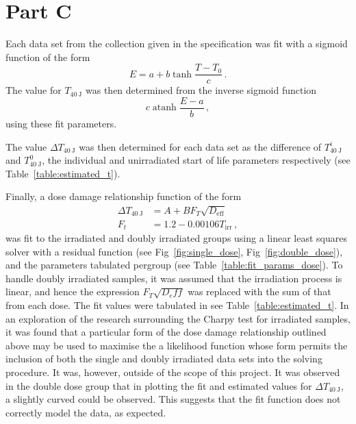 \documentclass{article}
\begin{document}
    
    
    
\section{Part C}
    Each data set from the collection given in the specification was fit with a sigmoid function of the form
    \begin{equation}
    \label{eq:sigmoid}
        E=a + b\tanh{\frac{T-T_0}{c}}\,.
    \end{equation}
    The value for $T_{\SI{40}{\joule}}$ was then determined from the inverse sigmoid function 
    \begin{equation}
        c\operatorname{atanh}{\frac{E-a}{b}}\,,
    \end{equation}
    using these fit parameters.
    
    The value $\Delta T_{\SI{40}{\joule}}$ was then determined for each data set as the difference of $T^i_{\SI{40}{\joule}}$ and $T^0_{\SI{40}{\joule}}$, the individual and unirradiated start of life parameters respectively (see Table~\ref{table:estimated_t}).
    
    Finally, a dose damage relationship function of the form 
    \begin{align}
    \label{eq:dose_damage}
    \Delta T_{\SI{40}{\joule}} &= A+B F_T\sqrt{D_{\text{eff}}} \\
    F_t &= 1.2 - 0.00106T_{\text{irr}}\,,
    \end{align}
    was fit to the irradiated and doubly irradiated groups using a linear least squares solver with a residual function (see Fig~\ref{fig:single_dose}, Fig~\ref{fig:double_dose}), and the parameters tabulated per\textendash group (see Table~\ref{table:fit_params_dose}). To handle doubly irradiated samples, it was assumed that the irradiation process is linear, and hence the expression $F_T\sqrt{D_eff}$ was replaced with the sum of that from each dose. The fit values were tabulated in see Table~\ref{table:estimated_t}. In an exploration of the research surrounding the Charpy test for irradiated samples, it was found that a particular form of the dose damage relationship outlined above may be used to maximise the a likelihood function whose form permits the inclusion of both the single and doubly irradiated data sets into the solving procedure. It was, however, outside of the scope of this project. It was observed in the double dose group that in plotting the fit and estimated values for $\Delta T_{\SI{40}{\joule}}$, a slightly curved could be observed. This suggests that the fit function does not correctly model the data, as expected.
    
\end{document}

